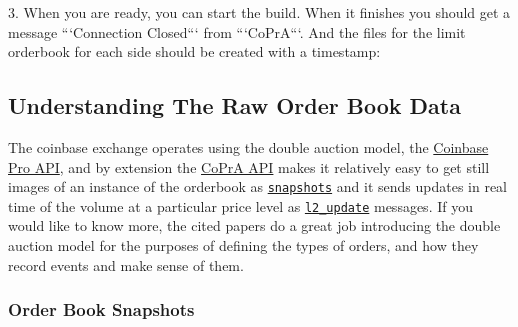 3. When you are ready, you can start the build. When it finishes you should get a message ```Connection Closed``` from ```CoPrA```. And the files for the limit orderbook for each side should be created with a timestamp:


\subsection{Understanding The Raw Order Book Data}

The coinbase exchange operates using the double auction model, the \href{https://docs.pro.coinbase.com/}{Coinbase Pro API}, and by extension the \href{https://copra.readthedocs.io/en/latest/}{CoPrA API} makes it relatively easy to get still images of an instance of the orderbook as \href{(https://docs.pro.coinbase.com/#the-level2-channel)}{\texttt{snapshots}} and it sends updates in real time of the volume at a particular price level as \href{https://docs.pro.coinbase.com/#the-level2-channel}{\texttt{l2\_update}} messages. If you would like to know more, the cited papers do a great job introducing the double auction model for the purposes of defining the types of orders, and how they record events and make sense of them. 

\subsubsection{Order Book Snapshots}

